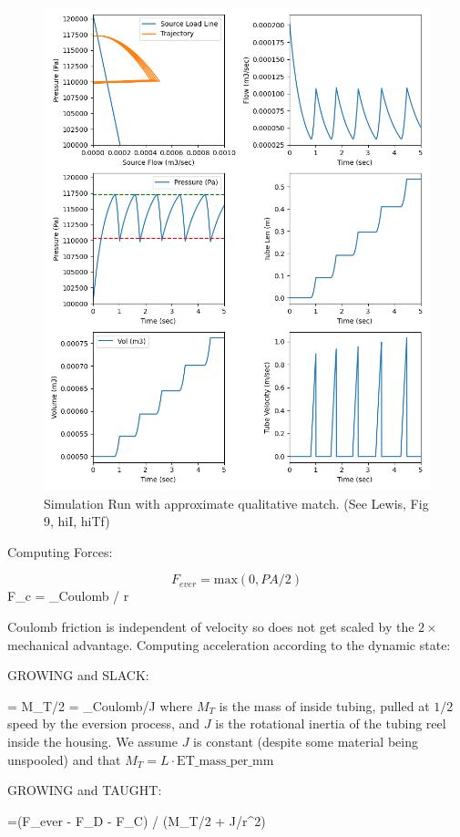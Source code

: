 \documentclass[letterpaper]{article}
\begin{document}
\begin{figure}\centering
\includegraphics[width=.75\textwidth]{Figure_9HhiI_hiTf_baseline.png}
\caption{Simulation Run with approximate qualitative match.  (See Lewis, Fig 9, hiI, hiTf)}
\label{Fig:baselineResults}
\end{figure}

Computing Forces:


\begin{equation}
  F_{ever} = \mathrm{max}(0, PA/2)
\end{equation}
\beq
  F_{c} = \tau_{Coulomb} / r
\eeq

Coulomb friction is independent of velocity so does not get scaled by the $2\times$ mechanical advantage.
Computing acceleration according to the dynamic state:

GROWING and SLACK:

\beq
{} =   {M_T/2}
\eeq
\beq
\dot{\theta} = \tau_{Coulomb}/J
\eeq
where $M_T$ is the mass of inside tubing, pulled at $1/2$ speed
by the eversion process, and $J$ is the rotational inertia of
the tubing reel inside the housing. We assume $J$ is constant
(despite some material being unspooled) and that $M_T =
L \cdot \mathrm{ET\_mass\_per\_mm} $

GROWING and TAUGHT:

\beq
{} =(F_{ever} - F_D - F_C) /  (M_T/2 + J/r^2)
\eeq
\end{document}
